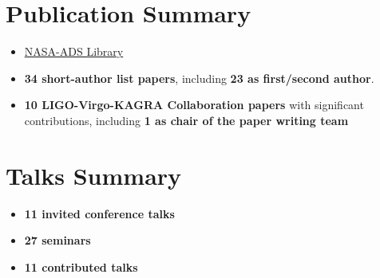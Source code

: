             \section{Publication Summary}
        \begin{itemize}[leftmargin=*]
            \item \href{https://ui.adsabs.harvard.edu/public-libraries/LqJDfKCTTdeuL_Inb7SwVw}{NASA-ADS Library}
            \item \textbf{34 short-author list papers}, including \textbf{23 as first/second author}.
            \item \textbf{10 LIGO-Virgo-KAGRA Collaboration papers} with significant contributions, including \textbf{1 as chair of the paper writing team}
        \end{itemize}

            \section{Talks Summary}
            \begin{itemize}[leftmargin=*]
            \item \textbf{11 invited conference talks}
            \item \textbf{27 seminars}
            \item \textbf{11 contributed talks}
            \end{itemize}

